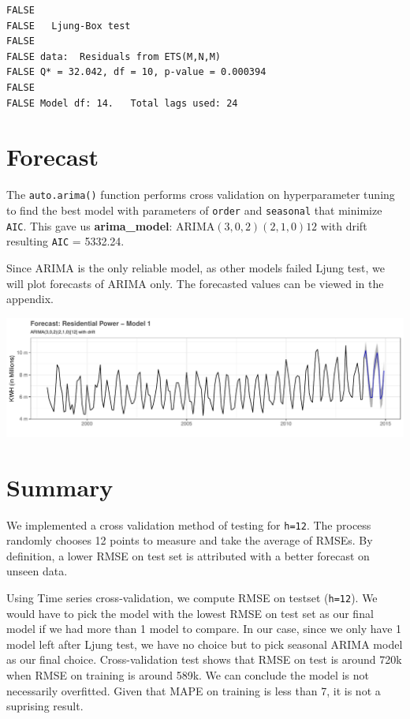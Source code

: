 \documentclass[openany]{book}
\begin{document}
\begin{verbatim}
FALSE 
FALSE   Ljung-Box test
FALSE 
FALSE data:  Residuals from ETS(M,N,M)
FALSE Q* = 32.042, df = 10, p-value = 0.000394
FALSE 
FALSE Model df: 14.   Total lags used: 24
\end{verbatim}

\hypertarget{forecast-1}{%
\section{Forecast}\label{forecast-1}}

The \texttt{auto.arima()} function performs cross validation on
hyperparameter tuning to find the best model with parameters of
\texttt{order} and \texttt{seasonal} that minimize \texttt{AIC}. This
gave us \textbf{arima\_model}: ARIMA\((3,0,2)(2,1,0)12\) with drift
resulting \texttt{AIC} = 5332.24.

Since ARIMA is the only reliable model, as other models failed Ljung
test, we will plot forecasts of ARIMA only. The forecasted values can be
viewed in the appendix.

\includegraphics{Group2_Project1_Fall2019_files/figure-latex/unnamed-chunk-15-1.pdf}

\hypertarget{summary-1}{%
\section{Summary}\label{summary-1}}

We implemented a cross validation method of testing for \texttt{h=12}.
The process randomly chooses 12 points to measure and take the average
of RMSEs. By definition, a lower RMSE on test set is attributed with a
better forecast on unseen data.

Using Time series cross-validation, we compute RMSE on testset
(\texttt{h=12}). We would have to pick the model with the lowest RMSE on
test set as our final model if we had more than 1 model to compare. In
our case, since we only have 1 model left after Ljung test, we have no
choice but to pick seasonal ARIMA model as our final choice.
Cross-validation test shows that RMSE on test is around 720k when RMSE
on training is around 589k. We can conclude the model is not necessarily
overfitted. Given that MAPE on training is less than 7, it is not a
suprising result.
\end{document}
